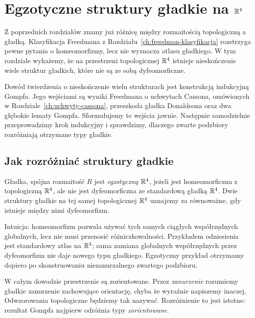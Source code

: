 \chapter{Egzotyczne struktury gładkie na \texorpdfstring{$\R^4$}{R4}}
\label{ch:egzotyczne-r4}

Z poprzednich rozdziałów znamy już różnicę między
rozmaitością topologiczną a gładką. Klasyfikacja
Freedmana z Rozdziału~\ref{ch:freedman-klasyfikacja}
rozstrzyga pewne pytania o homeomorfizmy, lecz nie
wyznacza atlasu gładkiego. W tym rozdziale wykażemy,
że na przestrzeni topologicznej $\R^4$ istnieje
nieskończenie wiele struktur gładkich, które nie są
ze sobą dyfeomorficzne.

Dowód twierdzenia o nieskończenie wielu strukturach
jest konstrukcją indukcyjną Gompfa. Jego
wejściami są wyniki Freedmana o uchwytach Cassona,
omówionych w Rozdziale~\ref{ch:uchwyty-cassona},
przeszkoda gładka Donaldsona oraz dwa głębokie
lematy Gompfa. Sformułujemy te wejścia jawnie.
Następnie samodzielnie przeprowadzimy krok
indukcyjny i sprawdzimy, dlaczego zwarte podzbiory
rozróżniają otrzymane typy gładkie.

\section{Jak rozróżniać struktury gładkie}
\label{sec:egzotyczne-r4-pojecia}

\begin{definicja}[Egzotyczna $\R^4$]
\label{def:egzotyczna-r4}
Gładka, spójna rozmaitość $R$ jest \emph{egzotyczną
$\R^4$}, jeżeli jest homeomorficzna z topologiczną
$\R^4$, ale nie jest dyfeomorficzna ze standardową
gładką $\R^4$. Dwie struktury gładkie na tej samej
topologicznej $\R^4$ uznajemy za równoważne, gdy
istnieje między nimi dyfeomorfizm.
\end{definicja}

Intuicja: homeomorfizm pozwala używać tych samych
ciągłych współrzędnych globalnych, lecz nie musi
przenosić różniczkowalności. Przykładem odniesienia
jest standardowy atlas na $\R^4$; sama zamiana
globalnych współrzędnych przez dyfeomorfizm
nie daje nowego typu gładkiego. Egzotyczny przykład
otrzymamy dopiero po skonstruowaniu niezanurzalnego
zwartego podzbioru.

W całym dowodzie przestrzenie są zorientowane.
Przez \emph{zanurzenie} rozumiemy gładkie zanurzenie
zachowujące orientację, chyba że wyraźnie napiszemy
inaczej. Odwzorowania topologiczne będziemy tak
nazywać. Rozróżnienie to jest istotne: rezultat
Gompfa najpierw odróżnia typy \emph{zorientowane}.

